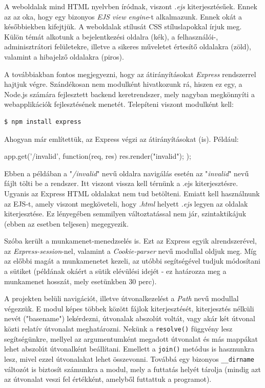 A weboldalak mind HTML nyelvben íródnak, viszont \textit{.ejs} kiterjesztésűek. Ennek az az oka, hogy egy bizonyos \textit{EJS view engine}-t alkalmazunk. Ennek okát a későbbiekben kifejtjük. A weboldalak stílusát CSS stíluslapokkal írjuk meg. Külön témát alkotunk a bejelentkezési oldalra (kék), a felhasználói-, adminisztrátori felületekre, illetve a sikeres műveletet értesítő oldalakra (zöld), valamint a hibajelző oldalakra (piros).

A továbbiakban fontos megjegyezni, hogy az átirányításokat \textit{Express} rendszerrel hajtjuk végre. Szándékosan nem modulként hivatkozunk rá, hiszen ez egy, a Node.js számára fejlesztett backend keretrendszer, mely nagyban megkönnyíti a webapplikációk fejlesztésének menetét. Telepíteni viszont modulként kell:

\begin{verbatim}
$ npm install express
\end{verbatim}

Ahogyan már említettük, az Express végzi az átirányításokat (is). Például:

\begin{javascript}
app.get('/invalid', function(req, res) {
  res.render("invalid");
});
\end{javascript}

Ebben a példában a "\textit{/invalid}" nevű oldalra navigálás esetén az "\textit{invalid}" nevű fájlt tölti be a rendszer. Itt viszont vissza kell térnünk a .ejs kiterjesztésre. Ugyanis az Express HTML oldalakat nem tud betölteni. Emiatt kell használnunk az EJS-t, amely viszont megköveteli, hogy \textit{.html} helyett \textit{.ejs} legyen az oldalak kiterjesztése. Ez lényegében semmilyen változtatással nem jár, szintaktikájuk (ebben az esetben teljesen) megegyezik.

Szóba került a munkamenet-menedzselés is. Ezt az Express egyik alrendszerével, az \textit{Express-session}-nel, valamint a \textit{Cookie-parser} nevű modullal oldjuk meg. Míg az előbbi magát a munkamenetet kezeli, az utóbbi segítségével tudjuk módosítani a sütiket (példának okáért a sütik elévülési idejét - ez határozza meg a munkamenet hosszát, mely esetünkben 30 perc).

A projekten belüli navigációt, illetve útvonalkezelést a \textit{Path} nevű modullal végezzük. E modul képes többek között fájlok kiterjesztését, kiterjesztés nélküli nevét ("basename") lekérdezni, útvonalak abszolút voltát, vagy akár két útvonal közti relatív útvonalat meghatározni. Nekünk a \texttt{resolve()} függvény lesz segítségünkre, mellyel az argumentumként megadott útvonalat és más mappákat lehet abszolút útvonalként beállítani. Emellett a \texttt{join()} metódus is hasznunkra lesz, mivel ezzel útvonalakat lehet összevonni. Továbbá egy bizonyos \texttt{\_\_dirname} változót is biztosít számunkra a modul, mely a futtatás helyét tárolja (mindig azt az útvonalat veszi fel értékként, amelyből futtattuk a programot).

